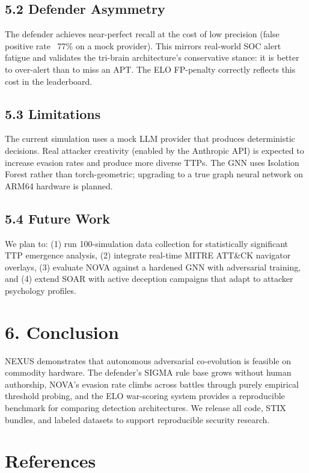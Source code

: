 \documentclass{article}
\begin{document}
\subsection{5.2 Defender Asymmetry}
The defender achieves near-perfect recall at the cost of low precision (false positive rate ~77\% on a mock provider). This mirrors real-world SOC alert fatigue and validates the tri-brain architecture's conservative stance: it is better to over-alert than to miss an APT. The ELO FP-penalty correctly reflects this cost in the leaderboard.


\subsection{5.3 Limitations}
The current simulation uses a mock LLM provider that produces deterministic decisions. Real attacker creativity (enabled by the Anthropic API) is expected to increase evasion rates and produce more diverse TTPs. The GNN uses Isolation Forest rather than torch-geometric; upgrading to a true graph neural network on ARM64 hardware is planned.


\subsection{5.4 Future Work}
We plan to: (1) run 100-simulation data collection for statistically significant TTP emergence analysis, (2) integrate real-time MITRE ATT\&CK navigator overlays, (3) evaluate NOVA against a hardened GNN with adversarial training, and (4) extend SOAR with active deception campaigns that adapt to attacker psychology profiles.



\section{6. Conclusion}

NEXUS demonstrates that autonomous adversarial co-evolution is feasible on commodity hardware. The defender's SIGMA rule base grows without human authorship, NOVA's evasion rate climbs across battles through purely empirical threshold probing, and the ELO war-scoring system provides a reproducible benchmark for comparing detection architectures. We release all code, STIX bundles, and labeled datasets to support reproducible security research.



\section{References}
\end{document}
